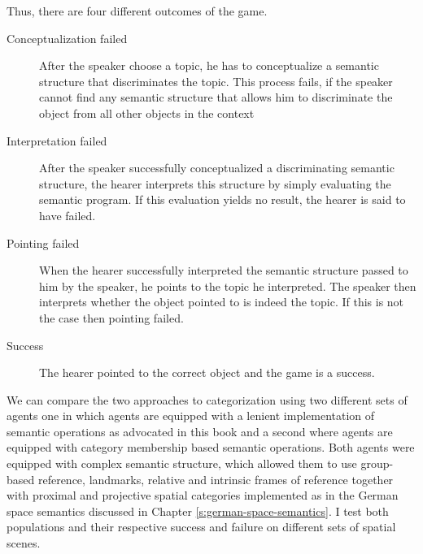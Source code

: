 Thus, there are four different outcomes of the game.
\begin{description}
\item[Conceptualization failed] After the speaker choose a topic, he has
to conceptualize a semantic structure that discriminates the topic.
This process fails, if the speaker cannot find any semantic structure
that allows him to discriminate the object from all other objects in the
context
\item[Interpretation failed] After the speaker successfully conceptualized
a discriminating semantic structure, the hearer interprets this structure
by simply evaluating the semantic program. If this evaluation
yields no result, the hearer is said to have failed.
\item[Pointing failed] When the hearer successfully interpreted the
semantic structure passed to him by the speaker, he points
to the topic he interpreted. The speaker then interprets whether
the object pointed to is indeed the topic. If this is not the
case then pointing failed.
\item[Success] The hearer pointed to the correct object and
the game is a success. 
\end{description}

We can compare the two approaches to categorization 
using two different sets of agents
one in which agents are equipped with a lenient implementation 
of semantic operations as advocated in this book and a second where
agents are equipped with category membership based
semantic operations. Both agents were equipped with
complex semantic structure, which allowed them to use
group-based reference, landmarks, relative and intrinsic frames
of reference together with proximal and projective spatial categories
implemented as in the German space semantics discussed in Chapter
\ref{s:german-space-semantics}. I test both populations and 
their respective success and failure on different sets of spatial scenes.


